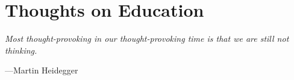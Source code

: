 \toclineskip
\section{Thoughts on Education}

\vspace{4mm}
\begin{displayquote}
	\textit{Most thought-provoking in our thought-provoking time is that we are still not thinking.}
	\vspace{2mm}
	\begin{flushright}
		---Martin Heidegger
	\end{flushright}
\end{displayquote}
\vspace{4mm}








